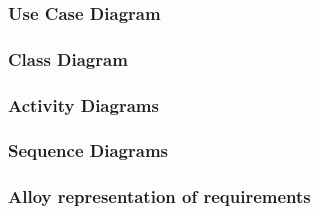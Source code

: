 \subsubsection{Use Case Diagram}
\subsubsection{Class Diagram}
\subsubsection{Activity Diagrams}
\subsubsection{Sequence Diagrams}
\subsubsection{Alloy representation of requirements}
